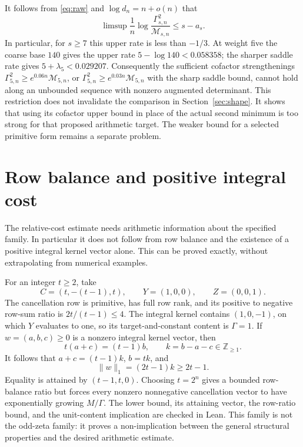 \documentclass[11pt]{article}
\theoremstyle{remark}
\newcommand{\Z}{\mathbb Z}
\newcommand{\cM}{\mathcal M}
\newcommand{\la}{\lambda}
\begin{document}
It follows from \eqref{eq:raw} and \(\log d_n=n+o(n)\) that
\[
 \limsup\frac1n\log\frac{\Gamma_{s,n}^2}{\cM_{s,n}}
       \le s-a_s.
\]
In particular, for \(s\ge7\) this upper rate is less than \(-1/3\).
At weight five the coarse base \(140\) gives the upper rate
\(5-\log140<0.058358\); the sharper saddle rate gives
\(5+\la_5<0.029207\).
Consequently the sufficient cofactor strengthenings
\(\Gamma_{5,n}^2\ge e^{0.06n}\cM_{5,n}\), or
\(\Gamma_{5,n}^2\ge e^{0.03n}\cM_{5,n}\) with the sharp saddle bound,
cannot hold along an unbounded sequence with nonzero augmented determinant.
This restriction does not invalidate the comparison in Section~\ref{sec:shape}.
It shows that using its cofactor upper bound in place of the actual
second minimum is too strong for that proposed arithmetic target.
The weaker bound for a selected primitive form remains a separate problem.

\section{Row balance and positive integral cost}
The relative-cost estimate needs arithmetic information about the specified
family. In particular it does not follow from row balance and the existence
of a positive integral kernel vector alone. This can be proved exactly,
without extrapolating from numerical examples.

For an integer \(t\ge2\), take
\[
 C=(t,-(t-1),t),\qquad Y=(1,0,0),\qquad Z=(0,0,1).
\]
The cancellation row is primitive, has full row rank, and its positive to
negative row-sum ratio is \(2t/(t-1)\le4\).
The integral kernel contains \((1,0,-1)\), on which \(Y\) evaluates to one,
so its target-and-constant content is \(\Gamma=1\).
If \(w=(a,b,c)\ge0\) is a nonzero integral kernel vector, then
\[
 t(a+c)=(t-1)b,\qquad k=b-a-c\in\Z_{\ge1}.
\]
It follows that \(a+c=(t-1)k\), \(b=tk\), and
\[
 \|w\|_1=(2t-1)k\ge2t-1.
\]
Equality is attained by \((t-1,t,0)\).
Choosing \(t=2^n\) gives a bounded row-balance ratio but forces every
nonzero nonnegative cancellation vector to have exponentially growing
\(M/\Gamma\). The lower bound, its attaining vector, the row-ratio bound,
and the unit-content implication are checked in Lean.
This family is not the odd-zeta family: it proves a non-implication between
the general structural properties and the desired arithmetic estimate.
\end{document}
